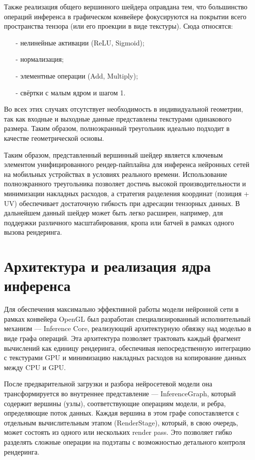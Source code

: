 \documentclass[a4paper,14pt]{extreport}
\begin{document}
            Также реализация общего вершинного шейдера оправдана тем, что большинство операций инференса в графическом конвейере фокусируются на покрытии всего пространства тензора (или его проекции в виде текстуры). Сюда относятся:
            \begin{itemize}
                \item[-] нелинейные активации (ReLU, Sigmoid);
                \item[-] нормализация;
                \item[-] элементные операции (Add, Multiply);
                \item[-] свёртки с малым ядром и шагом 1.
            \end{itemize}
            
            Во всех этих случаях отсутствует необходимость в индивидуальной геометрии, так как входные и выходные данные представлены текстурами одинакового размера. Таким образом, полноэкранный треугольник идеально подходит в качестве геометрической основы.

            Таким образом, представленный вершинный шейдер является ключевым элементом унифицированного рендер-пайплайна для инференса нейронных сетей на мобильных устройствах в условиях реального времени. Использование полноэкранного треугольника позволяет достичь высокой производительности и минимизации накладных расходов, а стратегия разделения координат (позиция + UV) обеспечивает достаточную гибкость при адресации тензорных данных. В дальнейшем данный шейдер может быть легко расширен, например, для поддержки различного масштабирования, кропа или батчей в рамках одного вызова рендеринга.

        \section{Архитектура и реализация ядра инференса}
            Для обеспечения максимально эффективной работы модели нейронной сети в рамках конвейера OpenGL был разработан специализированный исполнительный механизм — Inference Core, реализующий архитектурную обвязку над моделью в виде графа операций. Эта архитектура позволяет трактовать каждый фрагмент вычислений как единицу рендеринга, обеспечивая непосредственную интеграцию с текстурами GPU и минимизацию накладных расходов на копирование данных между CPU и GPU.

            После предварительной загрузки и разбора нейросетевой модели она трансформируется во внутреннее представление — InferenceGraph, который содержит вершины (узлы), соответствующие операциям модели, и ребра, определяющие поток данных. Каждая вершина в этом графе сопоставляется с отдельным вычислительным этапом (RenderStage), который, в свою очередь, может состоять из одного или нескольких render pass. Это позволяет гибко разделять сложные операции на подэтапы с возможностью детального контроля рендеринга.
            
\end{document}
